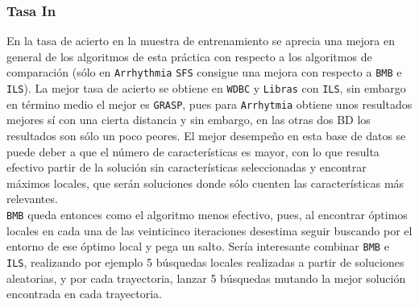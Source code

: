 \documentclass[11pt,leqno]{article}
\begin{document}
\subsubsection{Tasa In}
\begin{center}
\end{center}

En la tasa de acierto en la muestra de entrenamiento se aprecia una mejora en general de los algoritmos de esta práctica con respecto a los algoritmos de comparación (sólo en \texttt{Arrhythmia} \texttt{SFS} consigue una mejora con respecto a \texttt{BMB} e \texttt{ILS}). La mejor tasa de acierto se obtiene en \texttt{WDBC} y \texttt{Libras} con \texttt{ILS}, sin embargo en término medio el mejor es \texttt{GRASP}, pues para \texttt{Arrhytmia} obtiene unos resultados mejores sí con una cierta distancia y sin embargo, en las otras dos BD los resultados son sólo un poco peores. El mejor desempeño en esta base de datos se puede deber a que el número de características es mayor, con lo que resulta efectivo partir de la solución sin características seleccionadas y encontrar máximos locales, que serán soluciones donde sólo cuenten las características más relevantes.\\
\texttt{BMB} queda entonces como el algoritmo menos efectivo, pues, al encontrar óptimos locales en cada una de las veinticinco iteraciones desestima seguir buscando por el entorno de ese óptimo local y pega un salto. Sería interesante combinar \texttt{BMB} e \texttt{ILS}, realizando por ejemplo 5 búsquedas locales realizadas a partir de soluciones aleatorias, y por cada trayectoria, lanzar 5 búsquedas mutando la mejor solución encontrada en cada trayectoria.
 
\end{document}
